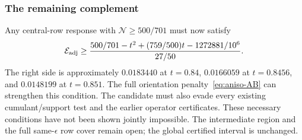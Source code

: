 \subsubsection{The remaining complement}
Any central-row response with $\mathcal N\ge500/701$ must now satisfy
\[
 \mathcal E_{\rm adj}\ge
 \frac{500/701-t^2+(759/500)t-1272881/10^6}{27/50}.
\]
The right side is approximately $0.0183440$ at $t=0.84$,
$0.0166059$ at $t=0.8456$, and $0.0148199$ at $t=0.851$.
The full orientation penalty~\eqref{eq:aniso-AB} can strengthen this
condition. The candidate must also evade every existing cumulant/support
test and the earlier operator certificates. These necessary conditions
have not been shown jointly impossible. The intermediate region and the
full same-$\epsilon$ row cover remain open; the global certified interval
is unchanged.

